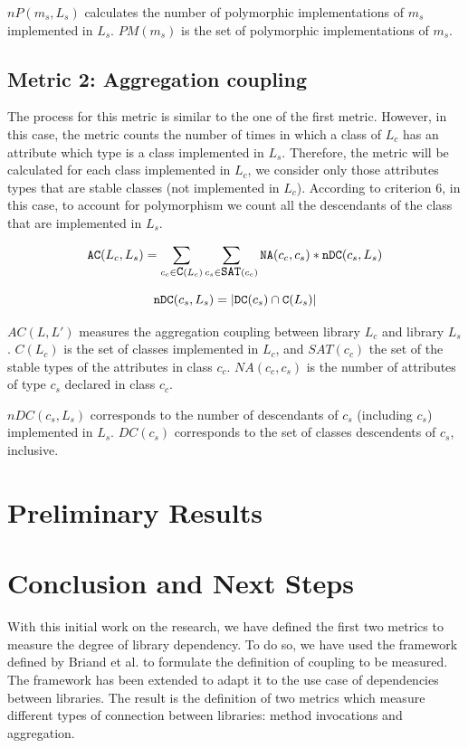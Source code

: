 \documentclass[a4paper]{article}
\begin{document}
$nP(m_s,L_s)$ calculates the number of polymorphic implementations of $m_s$ implemented in $L_s$. $PM(m_s)$ is the set of polymorphic implementations of $m_s$.

\subsection{Metric 2: Aggregation coupling}
The process for this metric is similar to the one of the first metric. However, in this case, the metric counts the number of times in which a class of $L_c$ has an attribute which type is a class implemented in $L_s$. Therefore, the metric will be calculated for each class implemented in $L_c$, we consider only those attributes types that are stable classes (not implemented in $L_c$). According to criterion 6, in this case, to account for polymorphism we count all the descendants of the class that are implemented in $L_s$.

\begin{equation}
  \verb|AC|(L_c,L_s) = \sum_{c_c \in \verb|C|(L_c)} \sum_{c_s \in \verb|SAT|(c_c)} \verb|NA|(c_c, c_s)*\verb|nDC|(c_s, L_s)
\end{equation}

\begin{equation}
    \verb|nDC|(c_s, L_s) = |\verb|DC|(c_s) \cap \verb|C|(L_s)|
\end{equation}

$AC(L,L')$ measures the aggregation coupling between library $L_c$ and library $L_s$. $C(L_c)$ is the set of classes implemented in $L_c$, and $SAT(c_c)$ the set of the stable types of the attributes in class $c_c$. $NA(c_c,c_s)$ is the number of attributes of type $c_s$ declared in class $c_c$.

$nDC(c_s,L_s)$ corresponds to the number of descendants of $c_s$ (including $c_s$) implemented in $L_s$. $DC(c_s)$ corresponds to the set of classes descendents of $c_s$, inclusive.

\section{Preliminary Results}



\section{Conclusion and Next Steps}
With this initial work on the research, we have defined the first two metrics to measure the degree of library dependency. To do so, we have used the framework defined by Briand et al. to formulate the definition of coupling to be measured. The framework has been extended to adapt it to the use case of dependencies between libraries. The result is the definition of two metrics which measure different types of connection between libraries: method invocations and aggregation.
\end{document}
